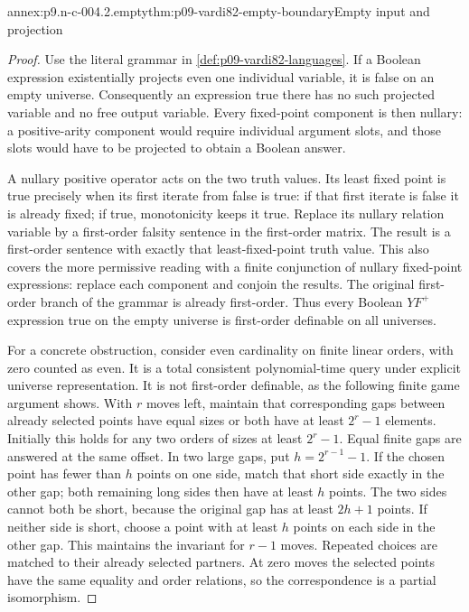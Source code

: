 \begin{annexitem}{annex:p9.n-c-004.2.empty}{thm:p09-vardi82-empty-boundary}{Empty input and projection}
\begin{proof}
Use the literal grammar in \cref{def:p09-vardi82-languages}.
If a Boolean expression existentially projects even one
individual variable, it is false on an empty universe. Consequently an
expression true there has no such projected variable and no free output
variable. Every fixed-point component is then nullary: a positive-arity
component would require individual argument slots, and those slots would
have to be projected to obtain a Boolean answer.

A nullary positive operator acts on the two truth values. Its least
fixed point is true precisely when its first iterate from false is true:
if that first iterate is false it is already fixed; if true, monotonicity
keeps it true. Replace its nullary relation variable by a first-order
falsity sentence in the first-order matrix. The result is a first-order
sentence with exactly that least-fixed-point truth value. This also covers
the more permissive reading with a finite conjunction of nullary
fixed-point expressions: replace each component and conjoin the results.
The original first-order branch of the grammar is already first-order.
Thus every Boolean \(YF^+\) expression true on the empty universe is
first-order definable on all universes.

For a concrete obstruction, consider even cardinality on finite linear
orders, with zero counted as even. It is a total consistent polynomial-time
query under explicit universe representation. It is not first-order
definable, as the following finite game argument shows. With \(r\)
moves left, maintain that corresponding gaps between already selected
points have equal sizes or both have at least \(2^r-1\) elements.
Initially this holds for any two orders of sizes at least \(2^r-1\).
Equal finite gaps are answered at the same offset. In two large gaps,
put \(h=2^{r-1}-1\). If the chosen point has fewer than \(h\) points
on one side, match that short side exactly in the other gap; both remaining
long sides then have at least \(h\) points. The two sides cannot both
be short, because the original gap has at least \(2h+1\) points.
If neither side is short, choose a point with at least \(h\) points
on each side in the other gap. This maintains the invariant for \(r-1\)
moves. Repeated choices are matched to their already selected partners.
At zero moves the selected points have the same equality and order
relations, so the correspondence is a partial isomorphism.


\end{proof}
\end{annexitem}
